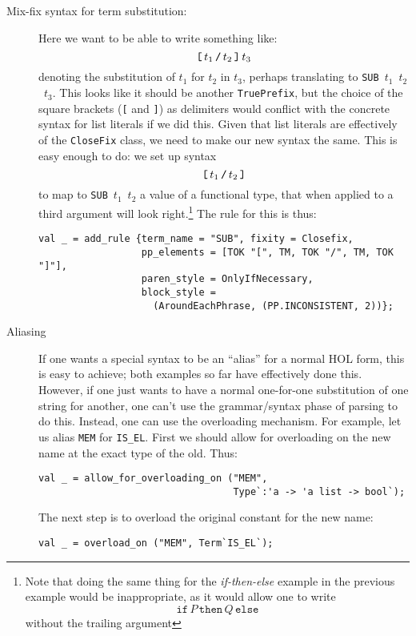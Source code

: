 {\begin{description}
\item[Mix-fix syntax for term substitution:] Here we want to be able
  to write something like:
  \[
  \mbox{\texttt{[}}\,t_1\,\mbox{\texttt{/}}\,t_2\,\mbox{\texttt{]}}\,t_3
  \]
  denoting the substitution of $t_1$ for $t_2$ in $t_3$, perhaps
  translating to \mbox{\texttt{SUB} $t_1$ $t_2$ $t_3$}.  This looks
like it should be another \texttt{TruePrefix}, but the choice of the
square brackets (\texttt{[} and \texttt{]}) as delimiters would
conflict with the concrete syntax for list literals if we did this.
Given that list literals are effectively of the \texttt{CloseFix}
class, we need to make our new syntax the same.  This is easy enough
to do: we set up syntax \[
\mbox{\texttt{[}}\,t_1\,\mbox{\texttt{/}}\,t_2\,\mbox{\texttt{]}}
  \] to map to \mbox{\texttt{SUB} $t_1$ $t_2$} a value of a functional
  type, that when applied to a third argument will look
  right.\footnote{Note that doing the same thing for the
    \textit{if-then-else} example in the previous example would be
    inappropriate, as it would allow one to write \[
    \texttt{if}\,P\,\texttt{then}\,Q\,\texttt{else}
    \] without the trailing argument}
  The rule for this is thus:
  \begin{verbatim}
val _ = add_rule {term_name = "SUB", fixity = Closefix,
                  pp_elements = [TOK "[", TM, TOK "/", TM, TOK "]"],
                  paren_style = OnlyIfNecessary,
                  block_style =
                    (AroundEachPhrase, (PP.INCONSISTENT, 2))};
\end{verbatim}

\item[Aliasing] If one wants a special syntax to be an ``alias'' for a
  normal HOL form, this is easy to achieve; both examples so far have
  effectively done this.  However, if one just wants to have a normal
  one-for-one substitution of one string for another, one can't use
  the grammar/syntax phase of parsing to do this.  Instead, one can
  use the overloading mechanism.  For example, let us alias
  \texttt{MEM} for \texttt{IS\_EL}.  First we should allow for
  overloading on the new name at the exact type of the old.  Thus:
  \begin{verbatim}
val _ = allow_for_overloading_on ("MEM",
                                  Type`:'a -> 'a list -> bool`);
\end{verbatim}
  \noindent The next step is to overload the original constant for the
  new name:
  \begin{verbatim}
val _ = overload_on ("MEM", Term`IS_EL`);
\end{verbatim}


\end{description}}

